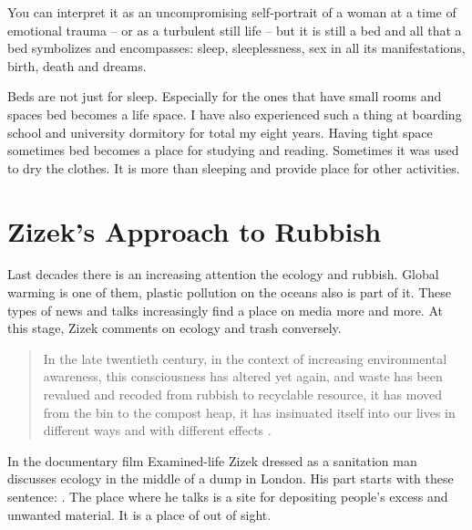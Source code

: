 You can interpret it as an uncompromising self-portrait of a woman at a time of emotional trauma – or as a turbulent still life – but it is still a bed and all that a bed symbolizes and encompasses: sleep, sleeplessness, sex in all its manifestations, birth, death and dreams.

Beds are not just for sleep. Especially for the ones that have small rooms and spaces bed becomes a life space. I have also experienced such a thing at boarding school and university dormitory for total my eight years. Having tight space sometimes bed becomes a place for studying and reading. Sometimes it was used to dry the clothes. It is more than sleeping and provide place for other activities.







%
%
\section{Zizek's Approach to Rubbish}
Last decades there is an increasing attention the ecology and rubbish. Global warming is one of them, plastic pollution on the oceans also is part of it. These types of news and talks increasingly find a place on media more and more. At this stage, Zizek comments on ecology and trash conversely.

\begin{quote}
In the late twentieth century, in the context of increasing environmental awareness, this consciousness has altered yet again, and waste has been revalued and recoded from rubbish to recyclable resource, it has moved from the bin to the compost heap, it has insinuated itself into our lives in different ways and with different effects \citep[5]{hawkins2005ethics}.
\end{quote}

In the documentary film Examined-life Zizek dressed as a sanitation man discusses ecology in the middle of a dump in London. His part starts with these sentence: . The place where he talks is a site for depositing people's excess and unwanted material. It is a place of out of sight.

